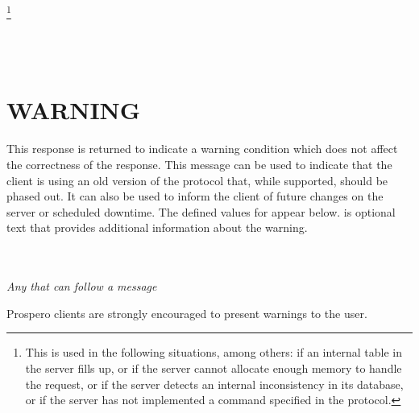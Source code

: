 \begin{command}
   \ors{} \metaor {} \metaor {} \metaor
	 \metaor {} \metaor {} \metaor
	 \ore \\
   \\
   \\
   \\
   \\
   \\
   \\
  \footnote{This is used in the following
	situations, among others: if
	an internal table in the server fills up, or if the server cannot
	allocate enough memory to handle the request, or if the server detects
	an internal inconsistency in its database, or if the server
has not implemented a command specified in the protocol.}\\
   \\
   \\
   \\
\end{command}

\section{WARNING}

\begin{command}
\commandsize
\protect{} \protect{}
	\zoos\protect{}\zooe
\end{command}

This response is returned to indicate a warning condition which does
not affect the correctness of the response.  This message can be used
to indicate that the client is using an old version of the protocol
that, while supported, should be phased out.  It can also be used to
inform the client of future changes on the server or scheduled
downtime.  The defined values for  appear
below.   is optional text that provides additional
information about the warning.

\begin{command}
   \\
   \\
  {\em Any  that can follow a  message}
\end{command}
Prospero clients are strongly encouraged to present warnings to the user.


